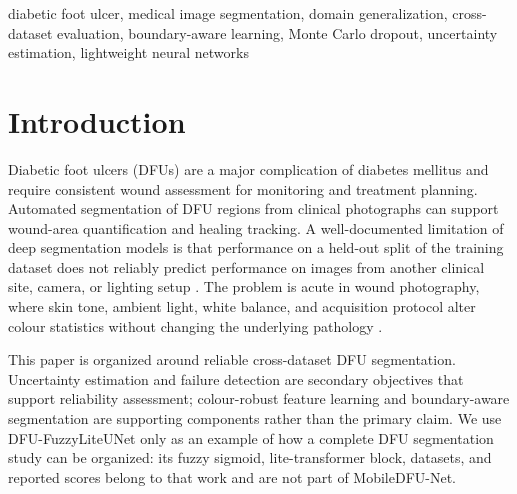 \documentclass[conference]{IEEEtran}
\begin{document}
\begin{IEEEkeywords}
diabetic foot ulcer, medical image segmentation, domain generalization, cross-dataset evaluation, boundary-aware learning, Monte Carlo dropout, uncertainty estimation, lightweight neural networks
\end{IEEEkeywords}

\section{Introduction}
\label{sec:intro}

Diabetic foot ulcers (DFUs) are a major complication of diabetes mellitus and require consistent wound assessment for monitoring and treatment planning. Automated segmentation of DFU regions from clinical photographs can support wound-area quantification and healing tracking. A well-documented limitation of deep segmentation models is that performance on a held-out split of the training dataset does not reliably predict performance on images from another clinical site, camera, or lighting setup \cite{Zhou2023DomainGeneralization}. The problem is acute in wound photography, where skin tone, ambient light, white balance, and acquisition protocol alter colour statistics without changing the underlying pathology \cite{Wang2024FUSeg,Cassidy2021DFUC2020}.

This paper is organized around reliable cross-dataset DFU segmentation. Uncertainty estimation and failure detection are secondary objectives that support reliability assessment; colour-robust feature learning and boundary-aware segmentation are supporting components rather than the primary claim. We use DFU-FuzzyLiteUNet \cite{Purwono2025DFUFuzzyLiteUNet} only as an example of how a complete DFU segmentation study can be organized: its fuzzy sigmoid, lite-transformer block, datasets, and reported scores belong to that work and are not part of MobileDFU-Net.
\end{document}
